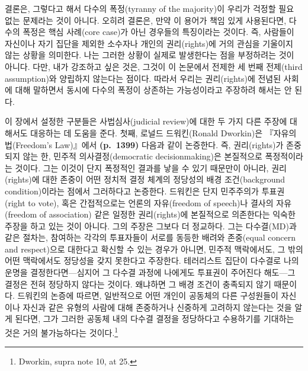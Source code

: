\documentclass[a4paper,12pt,oneside]{article}  %
\begin{document}
결론은, 그렇다고 해서 다수의 폭정(tyranny of the majority)이 우리가
걱정할 필요 없는 문제라는 것이 아니다. 오히려 결론은, 만약 이 용어가
책임 있게 사용된다면, 다수의 폭정은 핵심 사례(core case)가 아닌 경우들의
특징이라는 것이다. 즉, 사람들이 자신이나 자기 집단을 제외한 소수자나
개인의 권리(rights)에 거의 관심을 기울이지 않는 상황을 의미한다. 나는
그러한 상황이 실제로 발생한다는 점을 부정하려는 것이 아니다. 다만, 내가
강조하고 싶은 것은, 그것이 이 논문에서 전제한 세 번째 전제(third
assumption)와 양립하지 않는다는 점이다. 따라서 우리는 권리(rights)에
전념된 사회에 대해 말하면서 동시에 다수의 폭정이 상존하는 가능성이라고
주장하려 해서는 안 된다.

이 장에서 설정한 구분들은 사법심사(judicial review)에 대한 두 가지 다른
주장에 대해서도 대응하는 데 도움을 준다. 첫째, 로널드 드워킨(Ronald
Dworkin)은 『자유의 법(Freedom's Law)』에서 \textbf{(p.~1399)} 다음과
같이 논증한다. 즉, 권리(rights)가 존중되지 않는 한, 민주적
의사결정(democratic decisionmaking)은 본질적으로 폭정적이라는 것이다.
그는 이것이 단지 폭정적인 결과를 낳을 수 있기 때문만이 아니라,
권리(rights)에 대한 존중이 어떤 정치적 결정 체계의 정당성의 배경
조건(background condition)이라는 점에서 그러하다고 논증한다. 드워킨은
단지 민주주의가 투표권(right to vote), 혹은 간접적으로는 언론의
자유(freedom of speech)나 결사의 자유(freedom of association) 같은
일정한 권리(rights)에 본질적으로 의존한다는 익숙한 주장을 하고 있는 것이
아니다. 그의 주장은 그보다 더 정교하다. 그는 다수결(MD)과 같은 절차는,
참여하는 각각의 투표자들이 서로를 동등한 배려와 존중(equal concern and
respect)으로 대한다고 확신할 수 있는 경우가 아니면, 민주적 맥락에서도,
그 밖의 어떤 맥락에서도 정당성을 갖지 못한다고 주장한다. 테러리스트
집단이 다수결로 나의 운명을 결정한다면---심지어 그 다수결 과정에
나에게도 투표권이 주어진다 해도---그 결정은 전혀 정당하지 않다는 것이다.
왜냐하면 그 배경 조건이 충족되지 않기 때문이다. 드워킨의 논증에 따르면,
일반적으로 어떤 개인이 공동체의 다른 구성원들이 자신이나 자신과 같은
유형의 사람에 대해 존중하거나 신중하게 고려하지 않는다는 것을 알게
된다면, 그가 그러한 공동체 내의 다수결 결정을 정당하다고 수용하기를
기대하는 것은 거의 불가능하다는 것이다.\footnote{Dworkin, supra note 10,
  at 25.}
\end{document}
